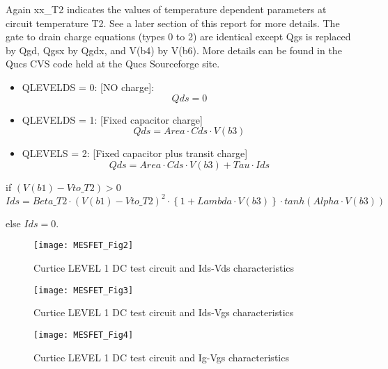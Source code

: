Again xx\_T2 indicates the values of temperature dependent parameters
at circuit temperature T2.  See a later section of this report for
more details.  The gate to drain charge equations (types 0 to 2) are
identical except Qgs is replaced by Qgd, Qgsx by Qgdx, and V(b4) by
V(b6). More details can be found in the Qucs CVS code held at the Qucs
Sourceforge site.

\begin{itemize}
 \item QLEVELDS = 0: [NO charge]: \begin{equation} Qds = 0  \end{equation}
 \item QLEVELDS = 1: [Fixed capacitor charge]  \begin{equation} Qds = Area \cdot Cds \cdot V(b3) \end{equation}
 \item QLEVELS = 2: [Fixed capacitor plus transit charge] \begin{equation} Qds = Area \cdot Cds \cdot V(b3) + Tau \cdot Ids \end{equation}
\end{itemize}




if $ (V(b1) - Vto\_T2) > 0$
\begin{equation}
 Ids = Beta\_T2 \cdot (V(b1)-Vto\_T2)^{2} \cdot \left\lbrace 1+Lambda \cdot V(b3) \right\rbrace  \cdot tanh(Alpha \cdot V(b3))
\end{equation} 

else $Ids = 0$.

\begin{figure} 
  \centering
  \texttt{[image: MESFET\_Fig2]}
  \caption{Curtice LEVEL 1 DC test circuit and Ids-Vds characteristics}  
  \label{fig:fig2}
\end{figure}

\begin{figure} 
  \centering
  \texttt{[image: MESFET\_Fig3]} 
  \caption{Curtice LEVEL 1 DC test circuit and Ids-Vgs characteristics} 
  \label{fig:fig3}
\end{figure} 

\begin{figure}
  \centering
  \texttt{[image: MESFET\_Fig4]} 
  \caption{Curtice LEVEL 1 DC test circuit and Ig-Vgs characteristics} 
  \label{fig:fig4}
\end{figure} 

